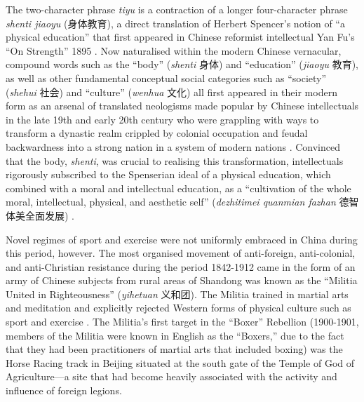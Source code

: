The two-character phrase \textit{tiyu} is a contraction of a longer four-character phrase \textit{shenti jiaoyu} (身体教育), a direct translation of Herbert Spencer’s notion of  ``a physical education'' that first appeared in Chinese reformist intellectual Yan Fu’s ``On Strength'' 1895 \citep[9-10]{Morris2004}.  Now naturalised within the modern Chinese vernacular, compound words such as the ``body'' (\textit{shenti} 身体) and ``education'' (\textit{jiaoyu} 教育), as well as other fundamental conceptual social categories such as ``society'' (\textit{shehui} 社会) and ``culture'' (\textit{wenhua} 文化) all first appeared in their modern form as an arsenal of translated neologisms made popular by Chinese intellectuals in the late 19th and early 20th century who were grappling with ways to transform a dynastic realm crippled by colonial occupation and feudal backwardness into a strong nation in a system of modern nations \citep{Pusey1983;Schwartz1964;Liu 1995;Huters2005}.   Convinced that the body, \textit{shenti}, was crucial to realising this transformation, intellectuals rigorously subscribed to the Spenserian ideal of a physical education, which combined with a moral and intellectual education, as a ``cultivation of the whole moral, intellectual, physical, and aesthetic self'' (\textit{dezhitimei quanmian fazhan} 德智体美全面发展) \citep[10]{Morris2004}.

Novel regimes of sport and exercise were not uniformly embraced in China during this period, however.  The most organised movement of anti-foreign, anti-colonial, and anti-Christian resistance during the period 1842-1912 came in the form of an army of Chinese subjects from rural areas of Shandong was known as the ``Militia United in Righteousness'' (\textit{yihetuan} 义和团).  The Militia trained in martial arts and meditation and explicitly rejected Western forms of physical culture such as sport and exercise \citep{Brownell2008}.  The Militia's first target in the ``Boxer'' Rebellion (1900-1901, members of the Militia were known in English as the ``Boxers,'' due to the fact that they had been practitioners of martial arts that included boxing) was the Horse Racing track in Beijing situated at the south gate of the Temple of God of Agriculture---a site that had become heavily associated with the activity and influence of foreign legions.

